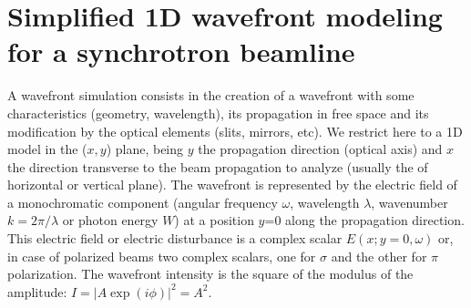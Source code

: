 \documentclass[preprint]{iucr}              %
\begin{document}


\section{Simplified 1D wavefront modeling for a synchrotron beamline}
\label{sec:wofry}


A wavefront simulation consists in the creation of a wavefront with some characteristics (geometry, wavelength), its propagation in free space and its modification by the optical elements (slits, mirrors, etc). We restrict here to a 1D model in the ($x,y$) plane, being $y$ the propagation direction (optical axis) and $x$ the direction transverse to the beam propagation to analyze (usually the of horizontal or vertical plane). The wavefront is represented by the electric field of a monochromatic component (angular frequency $\omega$, wavelength $\lambda$, wavenumber $k = 2 \pi / \lambda$ or photon energy $W$) at a position $y$=0 along the propagation direction. This electric field or electric disturbance is a complex scalar $E(x;y=0,\omega)$ or, in case of polarized beams two complex scalars, one for $\sigma$ and the other for $\pi$ polarization. The wavefront intensity is the square of the modulus of the amplitude: $I=|A \exp{(i\phi)}|^2=A^2$. 
\end{document}
